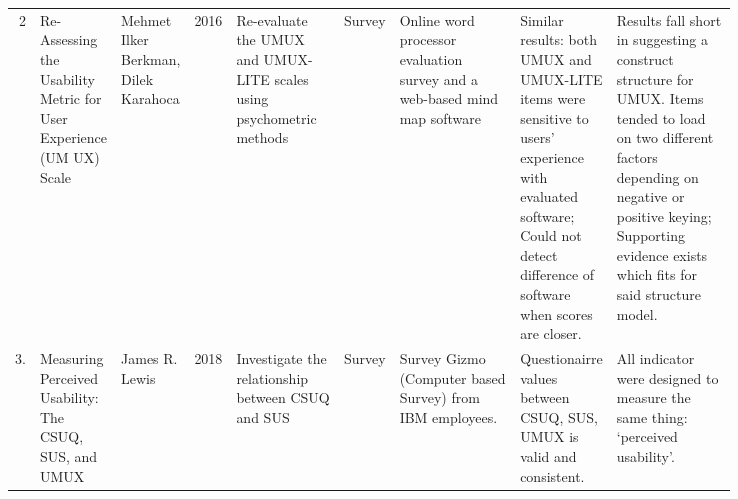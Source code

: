 \documentclass[
  11pt, %
]{assignment}
\begin{document}
\begin{landscape}
\begin{longtable}[l]{r | p{0.075\linewidth} p{0.08\linewidth} m{0.02\linewidth} p{0.15\linewidth} p{0.05\linewidth} p{0.17\linewidth} p{0.13\linewidth} p{0.17\linewidth}}
    2  & Re-Assessing the Usability Metric for User Experience (UM UX) Scale                                                                                   & Mehmet Ilker Berkman, Dilek Karahoca                                                                                        & 2016 & Re-evaluate the UMUX and UMUX-LITE scales using psychometric methods                                                     & Survey             & Online word processor evaluation survey and a web-based mind map software                                                              & Similar results: both UMUX and UMUX-LITE items were sensitive to users' experience with evaluated software; Could not detect difference of software when scores are closer. & Results  fall short in suggesting a construct structure for UMUX\@. Items tended to load on two different factors depending on negative or positive keying; Supporting evidence exists which fits for said structure model.                                                                                                                                  \\
    3. & Measuring Perceived Usability: The CSUQ, SUS, and UMUX                                                                                                & James R. Lewis                                                                                                              & 2018 & Investigate the relationship between CSUQ and SUS                                                                        & Survey             & Survey Gizmo (Computer based Survey) from IBM employees.                                                                               & Questionairre values between CSUQ, SUS, UMUX is valid and consistent.                                                                                                       & All indicator were designed to measure the same thing: `perceived usability'.                                                                                                                                                                                                                                                                                \\

\end{longtable}
\end{landscape}
\end{document}
